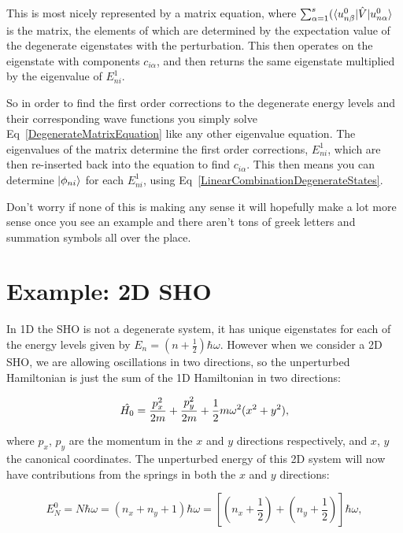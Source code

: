 \noindent This is most nicely represented by a matrix equation, where $\sum^s_{\alpha = 1} (\braket{u^0_{n\beta} | \Hat{V} | u^0_{n\alpha}}$ is the matrix, the elements of which are determined by the expectation value of the degenerate eigenstates with the perturbation. This then operates on the eigenstate with components $c_{i \alpha}$, and then returns the same eigenstate multiplied by the eigenvalue of $E^1_{ni}$.

\noindent So in order to find the first order corrections to the degenerate energy levels and their corresponding wave functions you simply solve Eq~\ref{DegenerateMatrixEquation} like any other eigenvalue equation. The eigenvalues of the matrix determine the first order corrections, $E^1_{ni}$, which are then re-inserted back into the equation to find $c_{i \alpha}$. This then means you can determine $\ket{\phi_{ni}}$ for each $E^1_{ni}$, using Eq~\ref{LinearCombinationDegenerateStates}.

\noindent Don't worry if none of this is making any sense it will hopefully make a lot more sense once you see an example and there aren't tons of greek letters and summation symbols all over the place.


\section{Example: 2D SHO}

In 1D the SHO is not a degenerate system, it has unique eigenstates for each of the energy levels given by $E_n = (n + \frac{1}{2})\hbar \omega$. However when we consider a 2D SHO, we are allowing oscillations in two directions, so the unperturbed Hamiltonian is just the sum of the 1D Hamiltonian in two directions:

\begin{equation}
    \Hat{H_0} = \frac{p^2_x}{2m} + \frac{p^2_y}{2m} + \frac{1}{2} m \omega^2 (x^2 + y^2),
    \label{UnperturbedHamiltonianSHO}
\end{equation}

\noindent where $p_x$, $p_y$ are the momentum in the $x$ and $y$ directions respectively, and $x$, $y$ the canonical coordinates. The unperturbed energy of this 2D system will now have contributions from the springs in both the $x$ and $y$ directions:

\begin{equation}
    E^0_N = N \hbar \omega = (n_x + n_y + 1) \hbar \omega = [(n_x + \frac{1}{2}) + (n_y + \frac{1}{2})] \hbar \omega,
    \label{UnperturbedEnergy2DSHO}
\end{equation}

